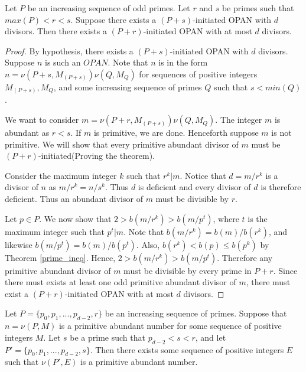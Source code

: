 \documentclass[../paper.tex]{subfiles}
\begin{document}


\begin{theorem}
\label{Divisibility}
Let $P$ be an increasing sequence of odd primes. Let $r$ and $s$ be
primes such that $max(P) < r < s$. Suppose there exists a $(P +
s)$-initiated OPAN with $d$ divisors. Then there exists a $(P +
r)$-initiated OPAN with at most $d$ divisors. 
\end{theorem}

\begin{proof}
By hypothesis, there exists a $(P + s)$-initiated OPAN with $d$ divisors.
Suppose $n$ is such an $OPAN$. Note that $n$ is in the form $n =
\nu(P + s, M_{(P + s)}) \nu(Q, M_Q)$ for sequences of positive 
integers $M_{(P + s)}, M_Q$, and some increasing sequence of
primes $Q$ such that $s < min(Q)$.

  We want to consider $m = \nu(P + r, M_{(P + s)}) \nu(Q, M_Q)$. 
The integer $m$ is abundant as $r < s$. If $m$ is primitive,
we are done. Henceforth suppose $m$ is not primitive. 
We will show that every primitive abundant divisor of $m$ must be 
$(P + r)$-initiated(Proving the theorem).

  Consider the maximum integer
$k$ such that $r^k | m$. Notice that $d = m / r^k$ is a divisor of $n$
as $m / r^k = n / s^k$. Thus $d$ is deficient and every divisor of
$d$ is therefore deficient. Thus an abundant divisor of $m$ must
be divisible by $r$.

Let $p \in P$.  We now show that $2 > b(m / r^k) > b(m / p^t)$, 
where $t$ is the maximum integer such that $p^t | m$. Note that
$b(m / r^k) = b(m) / b(r^k)$, and likewise $b(m / p^t) = b(m) /
b(p^t)$. Also, $b(r^k) < b(p) \leq b(p^k)$ by Theorem {\ref{prime_ineq}}. 
Hence, $2 > b(m / r^k) > b(m / p^t)$. Therefore any primitive
abundant divisor of $m$ must be divisible by every prime in 
$P + r$. Since there must exists at least one odd primitive 
abundant divisor of $m$, there must exist a $(P + r)$-initiated 
OPAN with at most $d$ divisors.
\end{proof}

\begin{coro}\label{Continuity}
Let $P = \{p_0, p_1, ..., p_{d-2}, r\}$ be an increasing sequence 
of primes. Suppose that $n = \nu(P, M)$ is a primitive abundant 
number for some sequence of positive integers $M$. Let $s$ be a 
prime such that $p_{d-2} < s < r$, and let $P' = \{p_0, p_1,...,
p_{d-2}, s\}$. Then there exists some sequence of positive integers
$E$ such that $\nu(P', E)$ is a primitive abundant number.
\end{coro}
\end{document}
